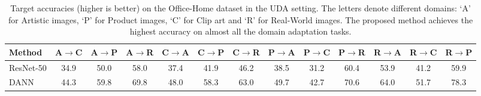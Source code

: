 \begin{table}[t]
    \caption[Evaluation (task-wise) of MMD-OT on the unsupervised domain adaptation experiment with the Office-Home dataset.]{Target accuracies (higher is better) on the Office-Home dataset in the UDA setting. The letters denote different domains: `A' for Artistic images, `P' for Product images, `C' for Clip art and `R' for Real-World images. The proposed method achieves the highest accuracy on almost all the domain adaptation tasks. 
    }\label{office-home}
    \setlength{\tabcolsep}{1.5pt}
    \centering
    \begin{footnotesize}
    \begin{tabular}{lcccccccccccc}
    \toprule
       Method & 
       A$\rightarrow$C&%
       A$\rightarrow$P&%
       A$\rightarrow$R&%
       C$\rightarrow$A&%
       C$\rightarrow$P&%
       C$\rightarrow$R&%
       P$\rightarrow$A&%
       P$\rightarrow$C&%
       P$\rightarrow$R&%
       R$\rightarrow$A&%
       R$\rightarrow$C&%
       R$\rightarrow$P\\
       \midrule
       ResNet-50 & 34.9 & 50.0 & 58.0 & 37.4 & 41.9 & 46.2 & 38.5 & 31.2 & 60.4 & 53.9 & 41.2 & 59.9\\
       \midrule
       DANN & \multirow{2}{*}{44.3} & \multirow{2}{*}{59.8} & \multirow{2}{*}{69.8} & \multirow{2}{*}{48.0}  & \multirow{2}{*}{58.3} & \multirow{2}{*}{63.0} & \multirow{2}{*}{49.7}  & \multirow{2}{*}{42.7} & \multirow{2}{*}{70.6} & \multirow{2}{*}{64.0} & \multirow{2}{*}{51.7} & \multirow{2}{*}{78.3} \\

\end{tabular}
\end{footnotesize}
\end{table}

